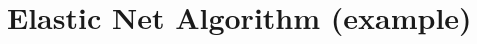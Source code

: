 \documentclass{acmtog} %
\begin{document}
\appendix

\section{Elastic Net Algorithm (example)}
\label{sec:ena}


\begin{acks}

\end{acks}




\end{document}
